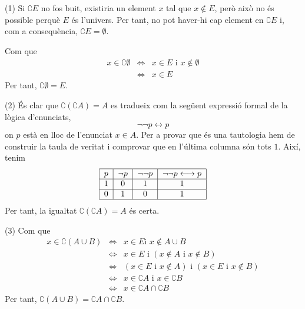 \begin{solucio}
(1) Si $\complement E$ no fos buit, existiria un element $x$ tal que $%
x\notin E$, però això no és possible perquè $E$ és
l'univers. Per tant, no pot haver-hi cap element en $\complement E$ i, com a
consequència, $\complement E=\emptyset $.

Com que%
\begin{equation*}
\begin{array}{lll}
x\in \complement \emptyset & \Longleftrightarrow & x\in E\text{ i }x\notin
\emptyset \\
& \Longleftrightarrow & x\in E%
\end{array}%
\end{equation*}%
Per tant, $\complement \emptyset =E$.

(2) És clar que $\complement \left( \complement A\right) =A$ es tradueix
com la següent expressió formal de la lògica d'enunciats,%
\begin{equation*}
\lnot \lnot p\longleftrightarrow p
\end{equation*}%
on $p$ està en lloc de l'enunciat $x\in A$. Per a provar que és una
tautologia hem de construir la taula de veritat i comprovar que en l'última columna són tots $1$. Així, tenim%
\begin{equation*}
\begin{tabular}{|c|c|c|c|}
\hline
$p$ & $\lnot p$ & $\lnot \lnot p$ & $\lnot \lnot p\longleftrightarrow p$ \\
\hline
$1$ & $0$ & $1$ & $1$ \\ \hline
$0$ & $1$ & $0$ & $1$ \\ \hline
\end{tabular}%
\end{equation*}%
Per tant, la igualtat $\complement \left( \complement A\right) =A$ és
certa.

(3) Com que%
\begin{equation*}
\begin{array}{lll}
x\in \complement \left( A\cup B\right) & \Longleftrightarrow & x\in E\text{
i }x\notin A\cup B \\
& \Longleftrightarrow & x\in E\text{ i }\left( x\notin A\text{ i }x\notin
B\right) \\
& \Longleftrightarrow & \left( x\in E\text{ i }x\notin A\right) \text{ i }%
\left( x\in E\text{ i }x\notin B\right) \\
& \Longleftrightarrow & x\in \complement A\text{ i }x\in \complement B \\
& \Longleftrightarrow & x\in \complement A\cap \complement B%
\end{array}%
\end{equation*}%
Per tant, $\complement \left( A\cup B\right) =\complement A\cap \complement
B $.


\end{solucio}
